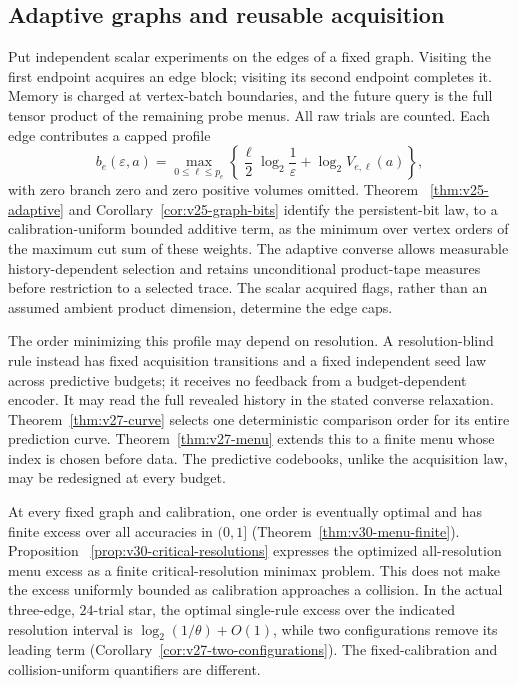 \subsection{Adaptive graphs and reusable acquisition}
Put independent scalar experiments on the edges of a fixed graph.
Visiting the first endpoint acquires an edge block; visiting its second
endpoint completes it. Memory is charged at vertex-batch boundaries,
and the future query is the full tensor product of the remaining probe
menus. All raw trials are counted. Each edge contributes a capped
profile
\[
 b_e(\varepsilon,a)=\max_{0\le\ell\le p_e}
       \left\{\frac{\ell}{2}\log_2\frac1\varepsilon
                           +\log_2V_{e,\ell}(a)\right\},
\]
with zero branch zero and zero positive volumes omitted. Theorem~
\ref{thm:v25-adaptive} and Corollary~\ref{cor:v25-graph-bits} identify
the persistent-bit law, to a calibration-uniform bounded additive term,
as the minimum over vertex orders of the maximum cut sum of these
weights. The adaptive converse allows measurable history-dependent
selection and retains unconditional product-tape measures before
restriction to a selected trace. The scalar acquired flags, rather than
an assumed ambient product dimension, determine the edge caps.

The order minimizing this profile may depend on resolution. A
resolution-blind rule instead has fixed acquisition transitions and a
fixed independent seed law across predictive budgets; it receives no
feedback from a budget-dependent encoder. It may read the full revealed
history in the stated converse relaxation. Theorem~\ref{thm:v27-curve}
selects one deterministic comparison order for its entire prediction
curve. Theorem~\ref{thm:v27-menu} extends this to a finite menu whose
index is chosen before data. The predictive codebooks, unlike the
acquisition law, may be redesigned at every budget.

At every fixed graph and calibration, one order is eventually optimal
and has finite excess over all accuracies in $(0,1]$
(Theorem~\ref{thm:v30-menu-finite}). Proposition~
\ref{prop:v30-critical-resolutions} expresses the optimized all-resolution
menu excess as a finite critical-resolution minimax problem. This does
not make the excess uniformly bounded as calibration approaches a
collision. In the actual three-edge, $24$-trial star, the optimal
single-rule excess over the indicated resolution interval is
$\log_2(1/\theta)+O(1)$, while two configurations remove its leading
term (Corollary~\ref{cor:v27-two-configurations}). The fixed-calibration
and collision-uniform quantifiers are different.

